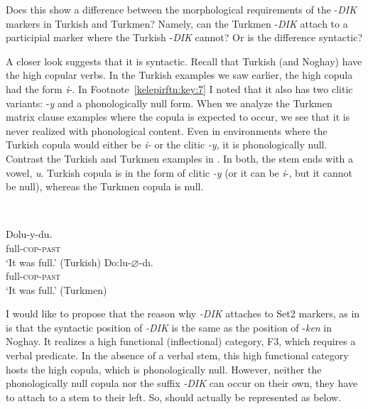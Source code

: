 \documentclass[output=paper]{langsci/langscibook}
\begin{document}
Does this show a difference between the morphological requirements of the -\textit{DIK} markers in Turkish and Turkmen? 
Namely, can the Turkmen -\textit{DIK} attach to a participial marker where the Turkish -\textit{DIK} cannot? 
Or is the difference syntactic?

A closer look suggests that it is syntactic. 
Recall that Turkish (and Noghay) have the high copular verbs. 
In the Turkish examples we saw earlier, the high copula had the form \textit{i}{}-. 
In Footnote~\ref{kelepirftn:key:7} I noted that it also has two clitic variants: -\textit{y} and a phonologically null form. 
When we analyze the Turkmen matrix clause examples where the copula is expected to occur, we see that it is never realized with phonological content. 
Even in environments where the Turkish copula would either be \textit{i-} or the clitic \textit{{}-y}, it is phonologically null. 
Contrast the Turkish and Turkmen examples in . 
In both, the stem ends with a vowel, \textit{u}. 
Turkish copula is in the form of clitic \textit{{}-y} (or it can be \textit{i}{}-, but it cannot be null), whereas the Turkmen copula is null. 
 

\ea ~\\%
    \label{kelepirex:key:22}
    \begin{multicols}{2}
    \ea 
        \gll Dolu-y-du.\\
        full-\textsc{cop}{}-\textsc{past}\\
        \glt `It was full.' (Turkish)
    \ex \label{kelepirex:key:22b}
        \gll Do:lu-$\varnothing$-dı. \\
        full-\textsc{cop}{}-\textsc{past} \\
        \glt `It was full.'   \citep[239]{Clark1998} (Turkmen)
    \z
\end{multicols}
\z 

I would like to propose that the reason why \textit{-DIK} attaches to Set2 markers, as in  is that the syntactic position of \textit{-DIK} is the same as the position of -\textit{ken} in Noghay. 
It realizes a high functional (inflectional) category, F3, which requires a verbal predicate. 
In the absence of a verbal stem, this high functional category hosts the high copula, which is phonologically null. 
However, neither the phonologically null copula nor the suffix \textit{-DIK} can occur on their own, they have to attach to a stem to their left. 
So,  should actually be represented as  below.
\end{document}

